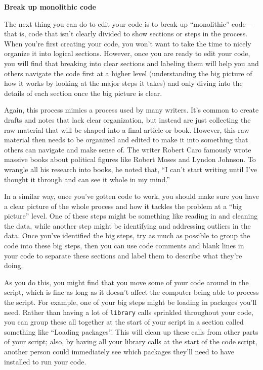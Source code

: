 \documentclass[]{tufte-book}
\begin{document}
\textbf{Break up monolithic code}

The next thing you can do to edit your code is to break up ``monolithic''
code---that is, code that isn't clearly divided to show sections or steps in the
process. When you're first creating your code, you won't want to take the time
to nicely organize it into logical sections. However, once you are ready to edit
your code, you will find that breaking into clear sections and labeling them
will help you and others navigate the code first at a higher level
(understanding the big picture of how it works by looking at the major steps it
takes) and only diving into the details of each section once the big picture is
clear.

Again, this process mimics a process used by many writers. It's common to
create drafts and notes that lack clear organization, but instead are just
collecting the raw material that will be shaped into a final article or book.
However, this raw material then needs to be organized and edited to make it
into something that others can navigate and make sense of. The writer Robert
Caro famously wrote massive books about political figures like Robert Moses and
Lyndon Johnson. To wrangle all his research into books, he noted that,
``I can't start writing until I've thought it through and can see it whole
in my mind.''

In a similar way, once you've gotten code to work, you should make sure you have
a clear picture of the whole process and how it tackles the problem at a
``big picture'' level. One of these steps might be something like reading in
and cleaning the data, while another step might be identifying and addressing
outliers in the data. Once you've identified the big steps, try as much as
possible to group the code into these big steps, then you can use code comments
and blank lines in your code to separate these sections and label them to
describe what they're doing.

As you do this, you might find that you move some of your code around in the
script, which is fine as long as it doesn't affect the computer being able to
process the script. For example, one of your big steps might be loading in
packages you'll need. Rather than having a lot of \texttt{library} calls sprinkled
throughout your code, you can group these all together at the start of your
script in a section called something like ``Loading packages''. This will
clean up these calls from other parts of your script; also, by having all
your library calls at the start of the code script, another person could
immediately see which packages they'll need to have installed to run your code.
\end{document}
